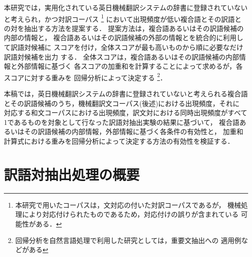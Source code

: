 本研究では，実用化されている英日機械翻訳システムの辞書に登録されていない
と考えられ，かつ対訳コーパス
\footnote{本研究で用いたコーパスは，文対応の付いた対訳コーパスであるが，
機械処理により対応付けられたものであるため，対応付けの誤りが含まれている
可能性がある．}
において出現頻度が低い複合語とその訳語との対を抽出する方法を提案する．
提案方法は，複合語あるいはその訳語候補の内部の情報と，
複合語あるいはその訳語候補の外部の情報とを統合的に利用して訳語対候補に
スコアを付け，全体スコアが最も高いものから順に必要なだけ訳語対候補を出力
する．
全体スコアは，複合語あるいはその訳語候補の内部情報と外部情報に基づく
各スコアの加重和を計算することによって求めるが，各スコアに対する重みを
回帰分析によって決定する
\footnote{回帰分析を自然言語処理で利用した研究としては，重要文抽出への
適用例\cite{Watanabe96}などがある}．

本稿では，英日機械翻訳システムの辞書に登録されていないと考えられる複合語
とその訳語候補のうち，機械翻訳文コーパス(後述)における出現頻度，それに
対応する和文コーパスにおける出現頻度，訳文対における同時出現頻度がすべて
1であるものを対象として行なった訳語対抽出実験の結果に基づいて，
複合語あるいはその訳語候補の内部情報，外部情報に基づく各条件の有効性と，
加重和計算式における重みを回帰分析によって決定する方法の有効性を検証する．


\section{訳語対抽出処理の概要}
\label{sec:outline}

